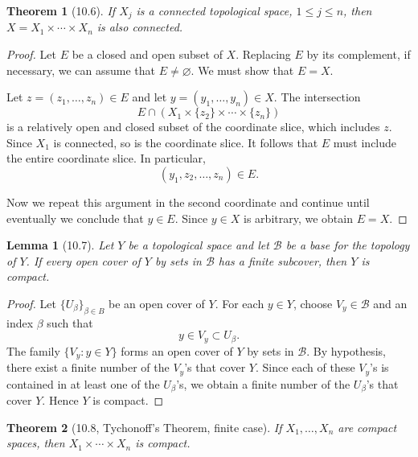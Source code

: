 \documentclass[12pt]{article}
\newtheorem{theorem}{Theorem}
\newtheorem{lemma}{Lemma}
\begin{document}
\begin{theorem}[10.6]
If $X_j$ is a connected topological space, $1\le j\le n$, then $X=X_1\times\cdots\times X_n$ is also connected.
\end{theorem}

\begin{proof}
Let $E$ be a closed and open subset of $X$. Replacing $E$ by its complement, if necessary, we can assume that $E\ne\varnothing$. We must show that $E=X$.

Let $z=(z_1,\dots,z_n)\in E$ and let $y=(y_1,\dots,y_n)\in X$. The intersection
\[
E\cap (X_1\times\{z_2\}\times\cdots\times\{z_n\})
\]
is a relatively open and closed subset of the coordinate slice, which includes $z$. Since $X_1$ is connected, so is the coordinate slice. It follows that $E$ must include the entire coordinate slice. In particular,
\[
(y_1,z_2,\dots,z_n)\in E.
\]

Now we repeat this argument in the second coordinate and continue until eventually we conclude that $y\in E$. Since $y\in X$ is arbitrary, we obtain $E=X$.
\end{proof}

\begin{lemma}[10.7]
Let $Y$ be a topological space and let $\mathcal{B}$ be a base for the topology of $Y$. If every open cover of $Y$ by sets in $\mathcal{B}$ has a finite subcover, then $Y$ is compact.
\end{lemma}

\begin{proof}
Let $\{U_\beta\}_{\beta\in B}$ be an open cover of $Y$. For each $y\in Y$, choose $V_y\in\mathcal{B}$ and an index $\beta$ such that
\[
y\in V_y\subset U_\beta.
\]
The family $\{V_y:y\in Y\}$ forms an open cover of $Y$ by sets in $\mathcal{B}$. By hypothesis, there exist a finite number of the $V_y$'s that cover $Y$. Since each of these $V_y$'s is contained in at least one of the $U_\beta$'s, we obtain a finite number of the $U_\beta$'s that cover $Y$. Hence $Y$ is compact.
\end{proof}

\begin{theorem}[10.8, Tychonoff's Theorem, finite case]
If $X_1,\dots,X_n$ are compact spaces, then $X_1\times\cdots\times X_n$ is compact.
\end{theorem}
\end{document}
